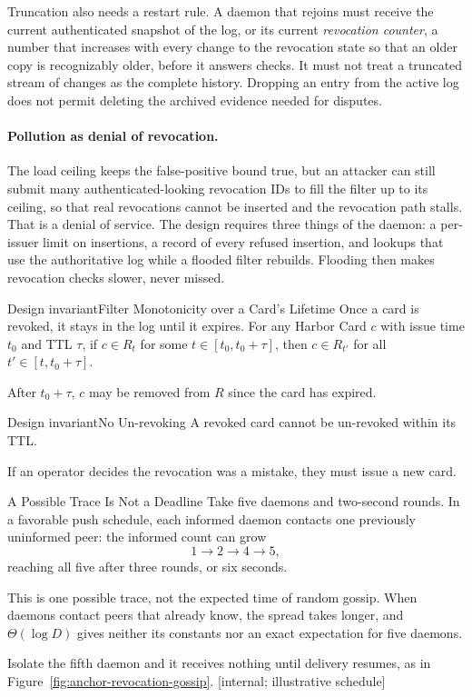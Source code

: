 \documentclass[11pt,a4paper]{article}
\theoremstyle{definition}
\begin{document}
Truncation also needs a restart rule. A daemon that rejoins must receive the
current authenticated snapshot of the log, or its current \emph{revocation
counter}, a number that increases with every change to the revocation state so
that an older copy is recognizably older, before it answers checks. It must not treat
a truncated stream of changes as the complete history. Dropping an entry from
the active log does not permit deleting the archived evidence needed for
disputes.

\paragraph{Pollution as denial of revocation.} The load ceiling keeps the false-positive bound true, but an attacker can still submit many authenticated-looking revocation IDs to fill the filter up to its ceiling, so that real revocations cannot be inserted and the revocation path stalls. That is a denial of service. The design requires three things of the daemon: a per-issuer limit on insertions, a record of every refused insertion, and lookups that use the authoritative log while a flooded filter rebuilds. Flooding then makes revocation checks slower, never missed.

\begin{pdclaim}{Design invariant}{Filter Monotonicity over a Card's Lifetime}
\setlength{\parskip}{4pt plus 1pt}
\label{prop:filter-mono}
Once a card is revoked, it stays in the log until it expires. For any Harbor Card $c$ with issue time $t_0$ and TTL $\tau$, if $c \in R_t$ for some $t \in [t_0, t_0+\tau]$, then $c \in R_{t'}$ for all $t' \in [t, t_0+\tau]$.

After $t_0+\tau$, $c$ may be removed from $R$ since the card has expired.
\end{pdclaim}

\begin{pdclaim}{Design invariant}{No Un-revoking}
\setlength{\parskip}{4pt plus 1pt}
\label{prop:no-reanim}
A revoked card cannot be un-revoked within its TTL.

If an operator decides the revocation was a mistake, they must issue a new card.
\end{pdclaim}

\begin{pdexample}{A Possible Trace Is Not a Deadline}
\setlength{\parskip}{4pt plus 1pt}
Take five daemons and two-second rounds. In a favorable push schedule, each
informed daemon contacts one previously uninformed peer: the informed count
can grow
\[
1\to2\to4\to5,
\]
reaching all five after three rounds, or six seconds.

This is one possible trace, not the expected time of random gossip. When
daemons contact peers that already know, the spread takes longer, and
$\Theta(\log D)$ gives neither its constants nor an exact expectation for five
daemons.

Isolate the fifth
daemon and it receives nothing until delivery resumes, as in
Figure~\ref{fig:anchor-revocation-gossip}. [internal; illustrative schedule]
\end{pdexample}
\end{document}

